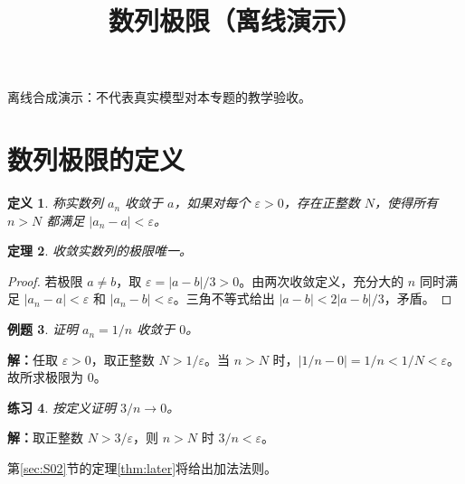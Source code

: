\documentclass[UTF8,fontset=fandol,11pt]{ctexart}
\title{数列极限（离线演示）}
\date{}
\newtheorem{definition}{定义}[section]
\newtheorem{theorem}[definition]{定理}
\newtheorem{example}[definition]{例题}
\newtheorem{exercise}[definition]{练习}
\begin{document}
\maketitle
\par\noindent 离线合成演示：不代表真实模型对本专题的教学验收。\par
\section{数列极限的定义}\label{sec:S01}
\begin{definition}
称实数列 $a_n$ 收敛于 $a$，如果对每个 $\varepsilon>0$，存在正整数 $N$，使得所有 $n>N$ 都满足 $|a_n-a|<\varepsilon$。
\end{definition}
\begin{theorem}
收敛实数列的极限唯一。
\end{theorem}
\begin{proof}
若极限 $a\ne b$，取 $\varepsilon=|a-b|/3>0$。由两次收敛定义，充分大的 $n$ 同时满足 $|a_n-a|<\varepsilon$ 和 $|a_n-b|<\varepsilon$。三角不等式给出 $|a-b|<2|a-b|/3$，矛盾。
\end{proof}
\begin{example}
证明 $a_n=1/n$ 收敛于 $0$。
\end{example}
\par\noindent\textbf{解：}任取 $\varepsilon>0$，取正整数 $N>1/\varepsilon$。当 $n>N$ 时，$|1/n-0|=1/n<1/N<\varepsilon$。故所求极限为 $0$。\par
\begin{exercise}
按定义证明 $3/n\to0$。
\end{exercise}
\par\noindent\textbf{解：}取正整数 $N>3/\varepsilon$，则 $n>N$ 时 $3/n<\varepsilon$。\par
第\ref{sec:S02}节的定理\ref{thm:later}将给出加法法则。\par
\end{document}
